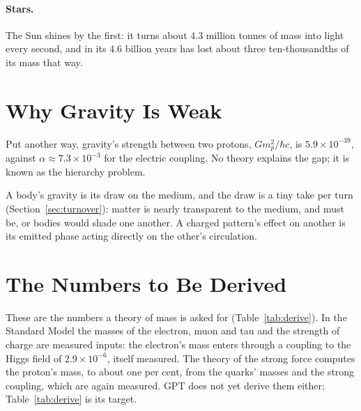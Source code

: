 \documentclass[11pt,a4paper]{article}
\begin{document}
\paragraph{Stars.}  The Sun shines by the first: it turns about 4.3 million tonnes of mass into light every second, and in its 4.6 billion years has lost about three ten-thousandths of its mass that way.

\section{Why Gravity Is Weak}
\label{sec:weak}

 Put another way, gravity's strength between two protons, $Gm_p^2/\hbar c$, is $5.9\times10^{-39}$, against $\alpha \approx 7.3\times10^{-3}$ for the electric coupling. No theory explains the gap; it is known as the hierarchy problem.

 A body's gravity is its draw on the medium, and the draw is a tiny take per turn (Section~\ref{sec:turnover}): matter is nearly transparent to the medium, and must be, or bodies would shade one another. A charged pattern's effect on another is its emitted phase acting directly on the other's circulation.  

\section{The Numbers to Be Derived}
\label{sec:numbers}

These are the numbers a theory of mass is asked for (Table~\ref{tab:derive}).  In the Standard Model the masses of the electron, muon and tau and the strength of charge are measured inputs: the electron's mass enters through a coupling to the Higgs field of $2.9\times10^{-6}$, itself measured. The theory of the strong force computes the proton's mass, to about one per cent, from the quarks' masses and the strong coupling, which are again measured. GPT does not yet derive them either; Table~\ref{tab:derive} is its target.
\end{document}
